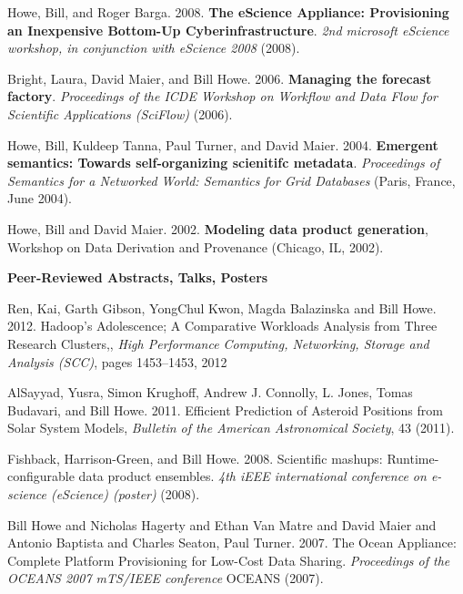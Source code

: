 \begin{bulletlist}
\item Howe, Bill, and Roger Barga.
2008. \textbf{The eScience Appliance: Provisioning an Inexpensive Bottom-Up
Cyberinfrastructure}. \emph{2nd microsoft eScience workshop, in
conjunction with eScience 2008} (2008). 

\item Bright, Laura, David Maier, and Bill Howe. 2006. \textbf{Managing the
forecast factory}. \emph{Proceedings of the ICDE Workshop on Workflow and
Data Flow for Scientific Applications (SciFlow)} (2006). 

\item Howe, Bill, Kuldeep Tanna, Paul Turner, and David Maier. 2004.
\textbf{Emergent semantics: Towards self-organizing scienitifc metadata}.
\emph{Proceedings of Semantics for a Networked World: Semantics for Grid
Databases} (Paris, France, June 2004). 

\item Howe, Bill and David Maier. 2002. \textbf{Modeling data product generation},
Workshop on Data Derivation and Provenance (Chicago, IL, 2002).
\end{bulletlist}

{\bf Peer-Reviewed Abstracts, Talks, Posters}
\begin{bulletlist}

\item Ren, Kai, Garth Gibson, YongChul Kwon, Magda Balazinska and Bill Howe. 2012.
Hadoop's Adolescence; A Comparative Workloads Analysis from Three Research Clusters,,
\emph{High Performance Computing, Networking, Storage and Analysis (SCC)}, 
pages 1453--1453, 2012

\item AlSayyad, Yusra, Simon Krughoff, Andrew J. Connolly,  L. Jones, Tomas Budavari, and Bill Howe. 2011. Efficient Prediction of Asteroid Positions from Solar System Models, 
\emph{Bulletin of the American Astronomical Society}, 43 (2011).

\item Fishback, Harrison-Green, and Bill Howe. 2008. Scientific mashups:
Runtime-configurable data product ensembles. \emph{4th iEEE
international conference on e-science (eScience) (poster)} (2008).

\item Bill Howe and Nicholas
Hagerty and Ethan Van Matre and David Maier and Antonio Baptista and
Charles Seaton, Paul Turner. 2007. The Ocean Appliance: Complete
Platform Provisioning for Low-Cost Data Sharing. \emph{Proceedings of
the OCEANS 2007 mTS/IEEE conference} OCEANS (2007). 

\end{bulletlist}

